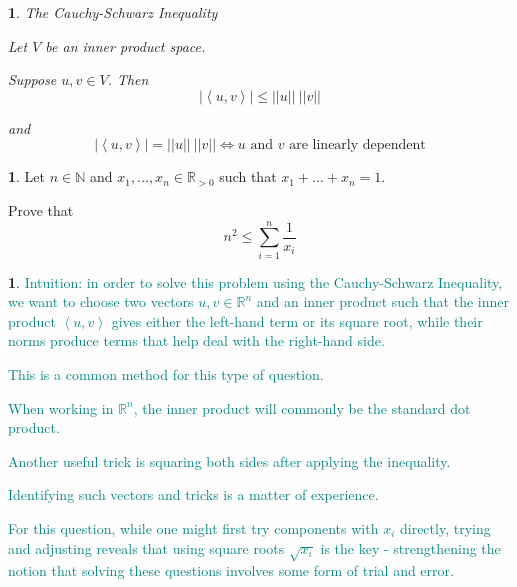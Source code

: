\documentclass[english]{article}
\theoremstyle{definition}
\theoremstyle{plain}
\theoremstyle{plain}
\newtheorem*{thm*}{\protect\theoremname}
\theoremstyle{definition}
\newtheorem*{problem*}{\protect\problemname}
\theoremstyle{definition}
\newtheorem*{sol*}{\protect\solutionname}
\providecommand{\problemname}{Problem}
\providecommand{\solutionname}{Solution}
\providecommand{\theoremname}{Theorem}
\begin{document}
\begin{thm*}
The Cauchy-Schwarz Inequality

Let $V$ be an inner product space.

Suppose $u,v\in V$. Then
\[
\left|\left\langle u,v\right\rangle \right|\le||u||\ ||v||
\]

and
\[
\left|\left\langle u,v\right\rangle \right|=||u||\ ||v||\iff u\text{ and }v\text{ are linearly dependent}
\]
\end{thm*}
\begin{problem*}
Let $n\in\mathbb{N}$ and $x_{1},\dots,x_{n}\in\mathbb{R}_{>0}$ such
that $x_{1}+\dots+x_{n}=1$.

Prove that
\[
n^{2}\le\underset{i=1}{\overset{n}{\sum}}\frac{1}{x_{i}}
\]
 
\end{problem*}
\begin{sol*}
\textcolor{teal}{Intuition: in order to solve this problem using the
Cauchy-Schwarz Inequality, we want to choose two vectors $u,v\in\mathbb{R}^{n}$
and an inner product such that the inner product $\left\langle u,v\right\rangle $
gives either the left-hand term or its square root, while their norms
produce terms that help deal with the right-hand side.}

\textcolor{teal}{This is a common method for this type of question.}

\textcolor{teal}{When working in $\mathbb{R}^{n}$, the inner product
will commonly be the standard dot product.}

\textcolor{teal}{Another useful trick is squaring both sides after
applying the inequality.}

\textcolor{teal}{Identifying such vectors and tricks is a matter of
experience. }

\textcolor{teal}{For this question, while one might first try components
with $x_{i}$ directly, trying and adjusting reveals that using square
roots $\sqrt{x_{i}}$ is the key - strengthening the notion that solving
these questions involves some form of trial and error. }
\end{sol*}
\end{document}
